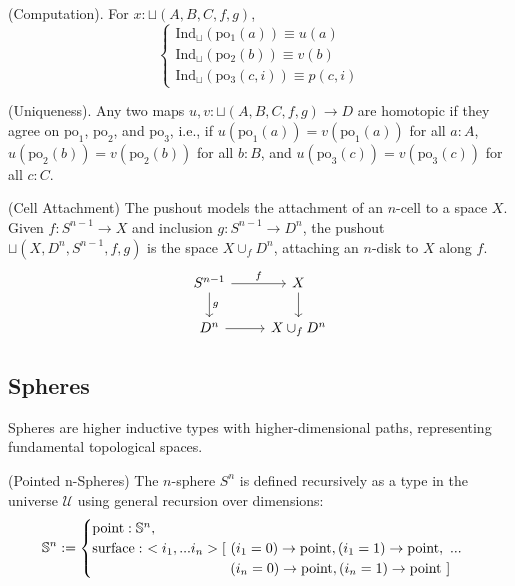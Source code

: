\documentclass{article}
\begin{document}
\begin{theorem} (Computation).
For \( x : \sqcup(A,B,C,f,g) \),
\[
\begin{cases}
\text{Ind$_\sqcup$}(\text{po$_1$}(a)) \equiv u(a) \\
\text{Ind$_\sqcup$}(\text{po$_2$}(b)) \equiv v(b) \\
\text{Ind$_\sqcup$}(\text{po$_3$}(c,i)) \equiv p(c,i)
\end{cases}
\]
\end{theorem}

\begin{theorem} (Uniqueness).
Any two maps \( u, v : \sqcup(A,B,C,f,g) \to D \) are homotopic
if they agree on \( \text{po}_1 \), \( \text{po}_2 \), and \( \text{po}_3 \), i.e.,
if \( u(\text{po}_1(a)) = v(\text{po}_1(a)) \) for all \( a : A \), \( u(\text{po}_2(b)) = v(\text{po}_2(b)) \)
for all \( b : B \), and \( u(\text{po}_3(c)) = v(\text{po}_3(c)) \) for all \( c : C \).
\end{theorem}

\begin{example} (Cell Attachment)
The pushout models the attachment of an \( n \)-cell to a space \( X \).
Given \( f : S^{n-1} \to X \) and inclusion \( g : S^{n-1} \to D^n \),
the pushout \( \sqcup(X,D^n,S^{n-1},f,g) \) is
the space \( X \cup_f D^n \), attaching an \( n \)-disk to \( X \) along \( f \).
\[
\begin{tikzcd}
S^{n-1} \arrow[r, "f"] \arrow[d, "g"] & X \arrow[d] \\
D^n \arrow[r] & X \cup_f D^n
\end{tikzcd}
\]
\end{example}

\subsection{Spheres}
Spheres are higher inductive types with higher-dimensional paths,
representing fundamental topological spaces.

\begin{definition} (Pointed n-Spheres)
The \( n \)-sphere \( S^n \) is defined recursively as a type in
the universe \( \mathcal{U} \) using general recursion over dimensions:
\[
\mathbb{S}^n :=
\begin{cases}
\text{point} : \mathbb{S}^n, \\
\text{surface} :\ <i_1,...i_n> [\ (i_1=0) \rightarrow \text{point}, (i_1=1) \rightarrow \text{point},\ ... \\
\hspace{3.47cm} (i_n=0) \rightarrow \text{point}, (i_n=1) \rightarrow \text{point}\ ]
\end{cases}
\]
\end{definition}
\end{document}
